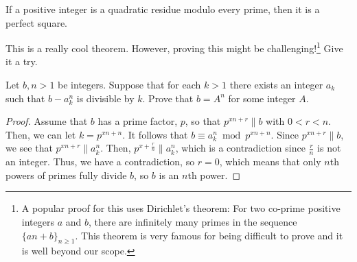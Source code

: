 	\begin{theorem}
		If a positive integer is a quadratic residue modulo every prime, then it is a perfect square.
	\end{theorem}
This is a really cool theorem. However, proving this might be challenging!\footnote{A popular proof for this uses Dirichlet's theorem: For two co-prime positive integers $a$ and $b$, there are infinitely many primes in the sequence $\{an+b\}_{n\geq1}$. This theorem is very famous for being difficult to prove and it is well beyond our scope.} Give it a try.
	\begin{theorem}
		Let $b,n > 1$ be integers. Suppose that for each $k > 1$ there exists an integer $a_k$ such that $b - a^n_k$ is divisible by $k$. Prove that $b = A^n$ for some integer $A$.
	\end{theorem}

	\begin{proof}
		Assume that $ b$ has a prime factor, $ p$, so that $ p^{xn + r}\|b$ with $ 0 < r < n$. Then, we can let $ k = p^{xn + n}$. It follows that $ b\equiv a_k^n\bmod p^{xn + n}$. Since $ p^{xn + r}\|b$, we see that $ p^{xn + r}\|a_k^n$. Then, $ p^{x + \frac {r}{n}}\|a_k^n$, which is a contradiction since $ \frac {r}{n}$ is not an integer. Thus, we have a contradiction, so $ r = 0$, which means that only $ n$th powers of primes fully divide $ b$, so $ b$ is an $ n$th power.
	\end{proof}
